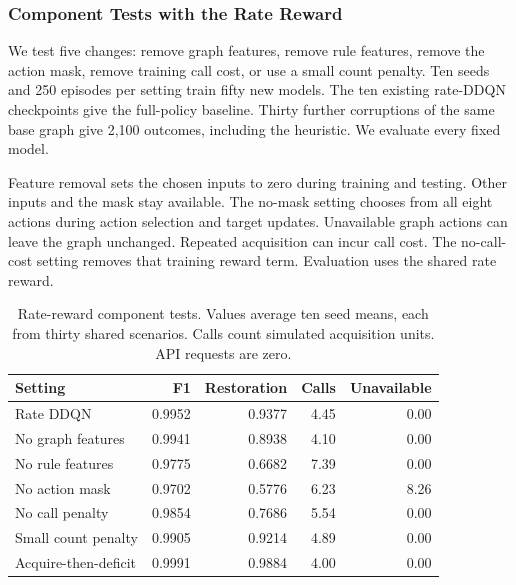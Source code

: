 \subsubsection{Component Tests with the Rate Reward}

\label{sec:rate_ablation}

We test five changes: remove graph features, remove rule features,
remove the action mask, remove training call cost, or use a small count
penalty. Ten seeds and 250 episodes per setting train fifty new models.
The ten existing rate-DDQN checkpoints give the full-policy baseline.
Thirty further corruptions of the same base graph give 2,100 outcomes,
including the heuristic. We evaluate every fixed model.

Feature removal sets the chosen inputs to zero during training and testing.
Other inputs and the mask stay available. The no-mask setting chooses
from all eight actions during action selection and target updates.
Unavailable graph actions can leave the graph unchanged. Repeated
acquisition can incur call cost. The no-call-cost setting removes that
training reward term. Evaluation uses the shared rate reward.

\begin{table}[t]

\centering

\caption{Rate-reward component tests. Values average ten seed means, each from thirty shared scenarios. Calls count simulated acquisition units. API requests are zero.}

\label{tab:rate_ablation}

\scriptsize

\begin{tabular}{lrrrr}

\toprule

Setting & F1 & Restoration & Calls & Unavailable \\

\midrule

Rate DDQN & 0.9952 & 0.9377 & 4.45 & 0.00 \\

No graph features & 0.9941 & 0.8938 & 4.10 & 0.00 \\

No rule features & 0.9775 & 0.6682 & 7.39 & 0.00 \\

No action mask & 0.9702 & 0.5776 & 6.23 & 8.26 \\

No call penalty & 0.9854 & 0.7686 & 5.54 & 0.00 \\

Small count penalty & 0.9905 & 0.9214 & 4.89 & 0.00 \\

Acquire-then-deficit & 0.9991 & 0.9884 & 4.00 & 0.00 \\

\bottomrule

\end{tabular}

\end{table}

